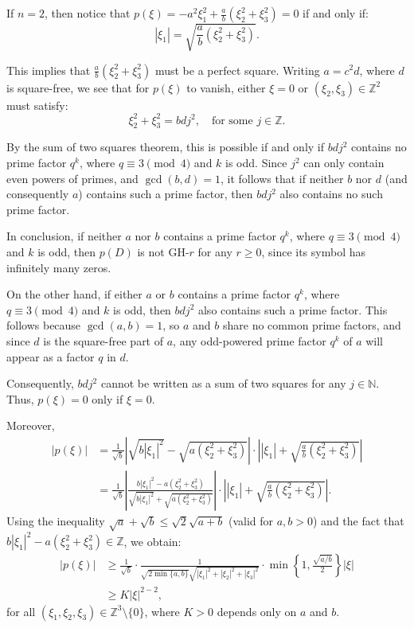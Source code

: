 \documentclass[11pt]{amsart}
\numberwithin{equation}{section}
\theoremstyle{definition}
\begin{document}
	\smallskip
	If $n = 2$, then notice that $p(\xi) = -a^2 \xi_1^2 + \frac{a}{b} (\xi_2^2 + \xi_3^2) = 0$ if and only if:
	\[
	|\xi_1| = \sqrt{\frac{a}{b} (\xi_2^2 + \xi_3^2)}.
	\]
	
	This implies that $ \frac{a}{b} (\xi_2^2 + \xi_3^2)$ must be a perfect square. Writing $a = c^2 d$, where $d$ is square-free, we see that for $p(\xi)$ to vanish,  either $\xi=0$ or $(\xi_2, \xi_3) \in \mathbb{Z}^2$ must satisfy:
	\[
	\xi_2^2 + \xi_3^2 = b d j^2, \quad \text{for some } j \in \mathbb{Z}.
	\]
	
	By the sum of two squares theorem, this is possible if and only if $b d j^2$ contains no prime factor $q^k$, where $q \equiv 3 \pmod{4}$ and $k$ is odd. Since $j^2$ can only contain even powers of primes, and $\gcd(b, d) = 1$, it follows that if neither $b$ nor $d$ (and consequently $a$) contains such a prime factor, then $b d j^2$ also contains no such prime factor.
	
	In conclusion, if neither $a$ nor $b$ contains a prime factor $q^k$, where $q \equiv 3 \pmod{4}$ and $k$ is odd, then $p(D)$ is not GH-$r$ for any $r \geq 0$, since its symbol has infinitely many zeros.

	On the other hand, if either $a$ or $b$ contains a prime factor $q^k$, where $q \equiv 3 \pmod{4}$ and $k$ is odd, then $b d j^2$ also contains such a prime factor. This follows because $\gcd(a, b) = 1$, so $a$ and $b$ share no common prime factors, and since $d$ is the square-free part of $a$, any odd-powered prime factor $q^k$ of $a$ will appear as a factor $q$ in $d$. 
	
	Consequently, $b d j^2$ cannot be written as a sum of two squares for any $j \in \mathbb{N}$. Thus, $p(\xi) = 0$ only if $\xi = 0$.
	
	Moreover, 
	\begin{align*}
		|p(\xi)| &= \frac{1}{\sqrt{b}} \left| \sqrt{b |\xi_1|^2} - \sqrt{a (\xi_2^2 + \xi_3^2)} \right| \cdot \left| |\xi_1| + \sqrt{\frac{a}{b} (\xi_2^2 + \xi_3^2)} \right| \\
		&= \frac{1}{\sqrt{b}} \left| \frac{b |\xi_1|^2 - a (\xi_2^2 + \xi_3^2)}{\sqrt{b |\xi_1|^2} + \sqrt{a (\xi_2^2 + \xi_3^2)}} \right| \cdot \left| |\xi_1| + \sqrt{\frac{a}{b} (\xi_2^2 + \xi_3^2)} \right|.
	\end{align*}
	Using the inequality $\sqrt{a} + \sqrt{b} \leq \sqrt{2} \sqrt{a + b}$ (valid for $a, b > 0$) and the fact that $b |\xi_1|^2 - a (\xi_2^2 + \xi_3^2) \in \mathbb{Z}$, we obtain:
	\begin{align*}
		|p(\xi)| &\geq \frac{1}{\sqrt{b}} \cdot \frac{1}{\sqrt{2 \min\{a, b\}} \sqrt{|\xi_1|^2 + |\xi_2|^2 + |\xi_3|^2}} \cdot \min\left\{1, \frac{\sqrt{a/b}}{2}\right\} |\xi| \\
		&\geq K |\xi|^{2-2},
	\end{align*}
	for all $(\xi_1, \xi_2, \xi_3) \in \mathbb{Z}^3 \setminus \{0\}$, where $K > 0$ depends only on $a$ and $b$.
	
\end{document}
